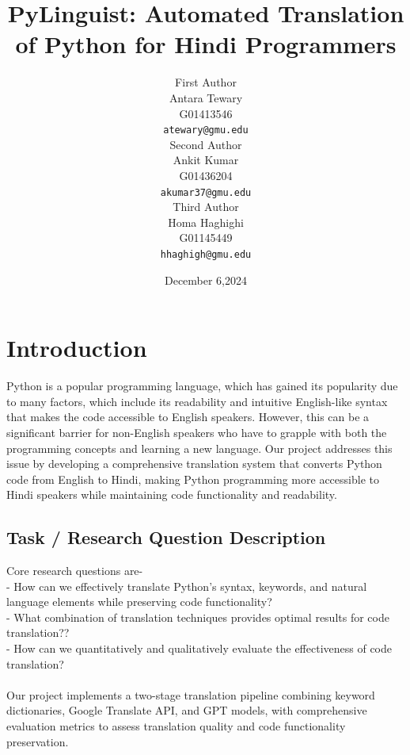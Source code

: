 \documentclass[11pt,a4paper]{article}
\title{PyLinguist: Automated Translation of Python for Hindi Programmers}
\author{First Author \\
  Antara Tewary\\ 
  G01413546\\
  \texttt{atewary@gmu.edu} \\\And
  Second Author \\
  Ankit Kumar\\ 
  G01436204\\
  \texttt{akumar37@gmu.edu}\\\And
  Third Author \\
  Homa Haghighi\\ 
  G01145449\\
  \texttt{hhaghigh@gmu.edu}}
\date{December 6,2024}
\begin{document}
\maketitle

\section{Introduction}
Python is a popular programming language, which has gained its popularity due to many factors, which include its readability and intuitive English-like syntax that makes the code accessible to English speakers. However, this can be a significant barrier for non-English speakers who have to grapple with both the programming concepts and learning a new language. Our project addresses this issue by developing a comprehensive translation system that converts Python code from English to Hindi, making Python programming more accessible to Hindi speakers while maintaining code functionality and readability.
            \subsection{Task / Research Question Description} 
            Core research questions are-\\
            - How can we effectively translate Python's syntax, keywords, and natural language elements while preserving code functionality?\\
            - What combination of translation techniques provides optimal results for code translation??\\
            - How can we quantitatively and qualitatively evaluate the effectiveness of code translation?\\ \\
            Our project implements a two-stage translation pipeline combining keyword dictionaries, Google Translate API, and GPT models, with comprehensive evaluation metrics to assess translation quality and code functionality preservation.
\end{document}
